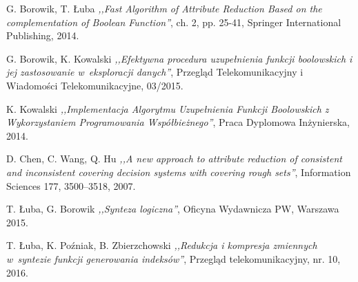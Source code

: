 
\begin{thebibliography}{99}


 G. Borowik, T. Łuba \emph{,,Fast Algorithm of Attribute Reduction Based on the complementation of Boolean Function''}, ch. 2, pp. 25-41, Springer International Publishing, 2014.

 G. Borowik, K. Kowalski \emph{,,Efektywna procedura uzupełnienia funkcji boolowskich i jej zastosowanie w~eksploracji danych''}, Przegląd Telekomunikacyjny i Wiadomości Telekomunikacyjne, 03/2015.

 K. Kowalski \emph{,,Implementacja Algorytmu Uzupełnienia Funkcji Boolowskich z Wykorzystaniem Programowania Współbieżnego''}, Praca Dyplomowa Inżynierska, 2014.

 D. Chen, C. Wang, Q. Hu \emph{,,A new approach to attribute reduction of consistent and inconsistent covering decision systems with covering rough sets''}, Information Sciences 177, 3500–3518, 2007.

 T. Łuba, G. Borowik \emph{,,Synteza logiczna''}, Oficyna Wydawnicza PW, Warszawa 2015.

 T. Łuba, K. Poźniak, B. Zbierzchowski \emph{,,Redukcja i kompresja zmiennych w~syntezie funkcji generowania indeksów''}, Przegląd telekomunikacyjny, nr. 10, 2016.


\end{thebibliography}
